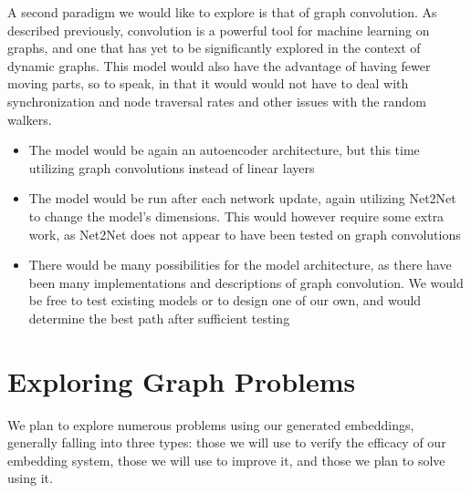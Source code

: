 \documentclass[10pt]{article}
\begin{document}
A second paradigm we would like to explore is that of graph convolution. As described previously, convolution is a powerful tool for machine learning on graphs, and one that has yet to be significantly explored in the context of dynamic graphs. This model would also have the advantage of having fewer moving parts, so to speak, in that it would would not have to deal with synchronization and node traversal rates and other issues with the random walkers.  \\

\begin{itemize}
\item The model would be again an autoencoder architecture, but this time utilizing graph convolutions instead of linear layers
\item The model would be run after each network update, again utilizing Net2Net to change the model's dimensions. This would however require some extra work, as Net2Net does not appear to have been tested on graph convolutions
\item There would be many possibilities for the model architecture, as there have been many implementations and descriptions of graph convolution. We would be free to test existing models or to design one of our own, and would determine the best path after sufficient testing
\end{itemize}

\pagebreak

\section{Exploring Graph Problems}

We plan to explore numerous problems using our generated embeddings, generally falling into three types: those we will use to verify the efficacy of our embedding system, those we will use to improve it, and those we plan to solve using it. 
\end{document}
